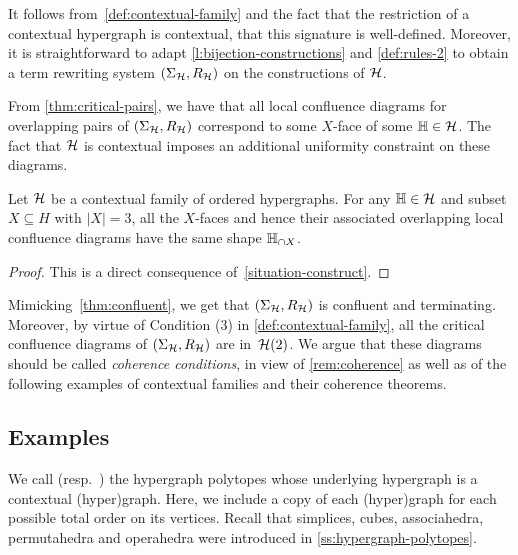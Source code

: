 It follows from~\cref{def:contextual-family} and the fact that the restriction of a contextual hypergraph is contextual, that this signature is well-defined.
Moreover, it is straightforward to adapt \cref{l:bijection-constructions} and \cref{def:rules-2} to obtain a term rewriting system $(\Sigma_{\mathcal{H}},R_{\mathcal{H}})$ on the constructions of $\mathcal{H}$. 

From \cref{thm:critical-pairs}, we have that all local confluence diagrams for overlapping pairs of $(\Sigma_{\mathcal{H}},R_{\mathcal{H}})$ correspond to some $X$-face of some ${\mathbb H} \in \mathcal{H}$.
The fact that $\mathcal{H}$ is contextual imposes an additional uniformity constraint on these diagrams.

\begin{theorem}
Let $\mathcal{H}$ be a contextual family of ordered hypergraphs.
For any ${\mathbb H} \in \mathcal{H}$ and subset $X \subseteq H$ with $|X|=3$, all the $X$-faces and hence their associated  overlapping local confluence diagrams 
have the same shape ${\mathbb H}_{\cap X}$. 
\end{theorem}

\begin{proof} 
This is a direct consequence of~\cref{situation-construct}.
\end{proof}

Mimicking~\cref{thm:confluent}, we get that $(\Sigma_{\mathcal{H}},R_{\mathcal{H}})$ is confluent and terminating.
Moreover, by virtue of Condition (3) in \cref{def:contextual-family}, all the critical confluence diagrams of $(\Sigma_{\mathcal{H}},R_{\mathcal{H}})$ are in~$\mathcal{H}(2)$.
We argue that these diagrams should be called \emph{coherence conditions}, in view of \cref{rem:coherence} as well as of the following examples of contextual families and their coherence theorems. 


\subsection{Examples}
\label{ss:examples}

We call  (resp.\ ) the hypergraph polytopes whose underlying hypergraph is a contextual (hyper)graph.
Here, we include a copy of each (hyper)graph for each possible total order on its vertices.
Recall that simplices, cubes, associahedra, permutahedra and operahedra were introduced in \cref{ss:hypergraph-polytopes}.

